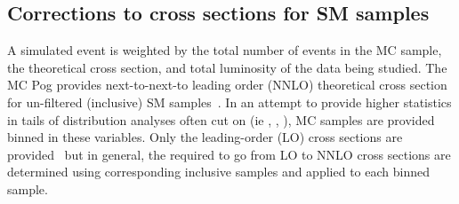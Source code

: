 %

\subsection{Corrections to cross sections for SM samples\label{sec:k-factors}}

A simulated event is weighted by the total number of events in the MC sample, 
the theoretical cross section, and total luminosity of the data being studied.
The MC Pog provides next-to-next-to leading order (NNLO) theoretical cross section
for un-filtered (inclusive) SM samples~\cite{twiki-xs}. In an attempt to 
provide higher statistics in tails of distribution analyses often cut on 
(ie \partonht, \nparton, \pthat), MC samples are provided binned in these
 variables. Only the leading-order (LO) cross sections are provided~\cite{prep} 
but in general, the \kfactors required to go from LO to NNLO cross sections
are determined using corresponding inclusive samples and applied to each binned sample. 

